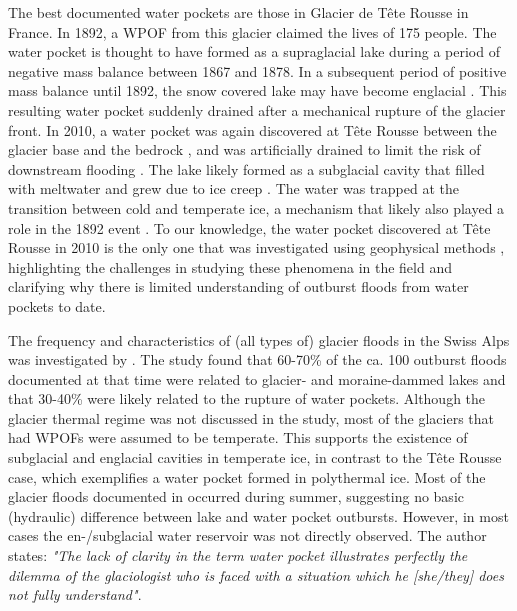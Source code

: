 The best documented water pockets are those in Glacier de Tête Rousse in France. In 1892, a WPOF from this glacier claimed the lives of 175 people. The water pocket is thought to have formed as a supraglacial lake during a period of negative mass balance between 1867 and 1878. In a subsequent period of positive mass balance until 1892, the snow covered lake may have become englacial \citep{Vincent&al2010b}. This resulting  water pocket suddenly drained after a mechanical rupture of the glacier front. In 2010, a water pocket was again discovered at Tête Rousse between the glacier base and the bedrock \citep{Vincent&al2012,Legchenko&2014,Garambois&al2016}, and was artificially drained to limit the risk of downstream flooding \citep{Vincent&al2012}. The lake likely formed as a subglacial cavity that filled with meltwater and grew due to ice creep \citep{Vincent&al2015}. The water was trapped at the transition between cold and temperate ice, a mechanism that likely also played a role in the 1892 event \citep{Gilbert&al2012}. To our knowledge, the water pocket discovered at Tête Rousse in 2010 is the only one that was investigated using geophysical methods \citep{Vincent&al2012, Legchenko&2014}, highlighting the challenges in studying these phenomena in the field and clarifying why there is limited understanding of outburst floods from water pockets to date. 

The frequency and characteristics of (all types of) glacier floods in the Swiss Alps was investigated by \cite{Haeberli1983}. The study found that 60-70\% of the ca. 100 outburst floods documented at that time were related to glacier- and moraine-dammed lakes and that 30-40\% were likely related to the rupture of water pockets. Although the glacier thermal regime was not discussed in the study, most of the glaciers that had WPOFs were assumed to be temperate. This supports the existence of subglacial and englacial cavities in temperate ice, in contrast to the Tête Rousse case, which exemplifies a water pocket formed in polythermal ice. Most of the glacier floods documented in \cite{Haeberli1983} occurred during summer, suggesting no basic (hydraulic) difference between lake and water pocket outbursts. However, in most cases the en-/subglacial water reservoir was not directly observed. The author states: \textit{"The lack of clarity in the term water pocket illustrates perfectly the dilemma of the glaciologist who is faced with a situation which he [she/they] does not fully understand"}. 

